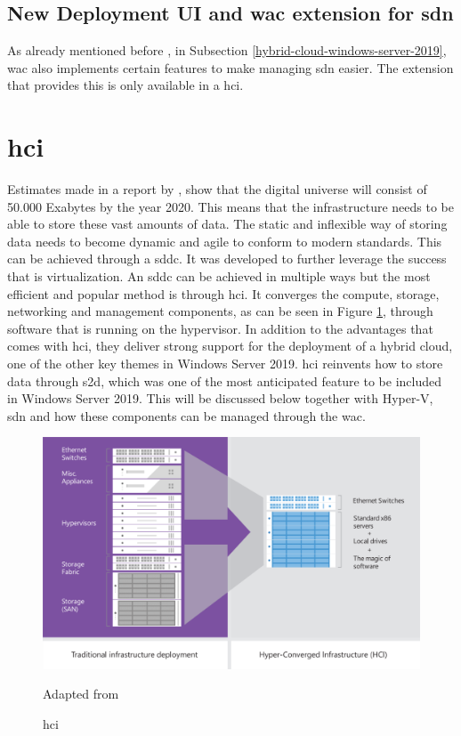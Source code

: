 \subsection*{New Deployment UI and \acrlong{wac} extension for \acrshort{sdn}}
As already mentioned before , in Subsection \ref{hybrid-cloud-windows-server-2019}, \acrlong{wac} also implements certain features to make managing \acrshort{sdn} easier. 
The extension that provides this is only available in a \acrshort{hci}.

\clearpage

\section{\acrfull{hci}}
Estimates made in a report by \textcite{Gantz2012}, show that the digital universe will consist of 50.000 Exabytes by the year 2020. 
This means that the infrastructure needs to be able to store these vast amounts of data. 
The static and inflexible way of storing data needs to become dynamic and agile to conform to modern standards. 
This can be achieved through a \acrfull{sddc}. 
It was developed to further leverage the success that is virtualization. 
An \acrshort{sddc} can be achieved in multiple ways but the most efficient and popular method is through \acrshort{hci}. 
It converges the compute, storage, networking and management components, as can be seen in Figure \ref{fig:HCI}, through software that is running on the hypervisor. 
In addition to the advantages that comes with \acrshort{hci}, they deliver strong support for the deployment of a hybrid cloud, one of the other key themes in Windows Server 2019. 
\acrshort{hci} reinvents how to store data through \acrshort{s2d}, which was one of the most anticipated feature to be included in Windows Server 2019. 
This will be discussed below together with Hyper-V, \acrshort{sdn} and how these components can be managed through the \acrlong{wac}. \autocite{Haag2016}

\begin{figure}[h]
	\includegraphics[width=0.8\linewidth]{img/StandVanZaken/HCI.png}
	\captionsetup{width=0.6\linewidth}
	\centering		
	\caption[\acrshort{hci}]{\acrfull{hci}}
	\scriptsize	
	Adapted from \cite{Woolslayer2018}
	\label{fig:HCI}
\end{figure}

